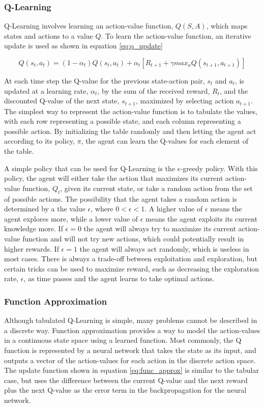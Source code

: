\documentclass[letterpaper,12pt]{article}
\begin{document}
\subsubsection{Q-Learning}
Q-Learning involves learning an action-value function, $Q(S, A)$, which maps states and actions to a value $Q$. To learn the action-value function, an iterative update is used as shown in equation \ref{eq:q_update}

\begin{equation}
	\label{eq:q_update}
	Q(s_t, a_t) = (1-\alpha_t) Q(s_t, a_t) + \alpha_t [R_{t+1} + \gamma max_a Q(s_{t+1}, a_{t+1})]
\end{equation}

At each time step the Q-value for the previous state-action pair, $s_t$ and $a_t$, is updated at a learning rate, $\alpha_t$, by the sum of the received reward, $R_t$, and the discounted Q-value of the next state, $s_{t+1}$, maximized by selecting action $a_{t+1}$. The simplest way to represent the action-value function is to tabulate the values, with each row representing a possible state, and each column representing a possible action. By initializing the table randomly and then letting the agent act according to its policy, $\pi$, the agent can learn the Q-values for each element of the table.

A simple policy that can be used for Q-Learning is the $\epsilon$-greedy policy. With this policy, the agent will either take the action that maximizes its current action-value function, $Q_t$, given its current state, or take a random action from the set of possible actions. The possibility that the agent takes a random action is determined by a the value $\epsilon$, where $0<\epsilon<1$. A higher value of $\epsilon$ means the agent explores more, while a lower value of $\epsilon$ means the agent exploits its current knowledge more. If $\epsilon=0$ the agent will always try to maximize its current action-value function and will not try new actions, which could potentially result in higher rewards. If $\epsilon=1$ the agent will always act randomly, which is useless in most cases. There is always a trade-off between exploitation and exploration, but certain tricks can be used to maximize reward, such as decreasing the exploration rate, $\epsilon$, as time passes and the agent learns to take optimal actions.

\subsubsection{Function Approximation}
Although tabulated Q-Learning is simple, many problems cannot be described in a discrete way. Function approximation provides a way to model the action-values in a continuous state space using a learned function. Most commonly, the Q function is represented by a neural network that takes the state as its input, and outputs a vector of the action-values for each action in the discrete action space. The update function shown in equation \ref{eq:func_approx} is similar to the tabular case, but uses the difference between the current Q-value and the next reward plus the next Q-value as the error term in the backpropagation for the neural network.
\end{document}
